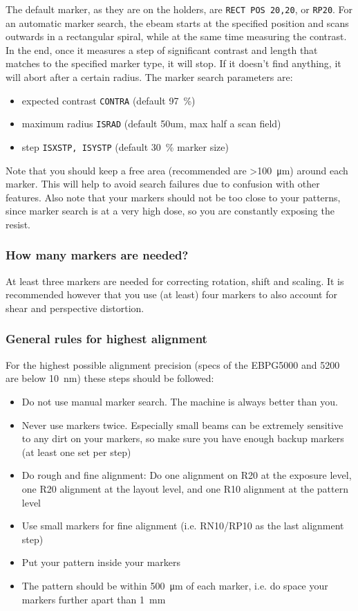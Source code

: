 The default marker, as they are on the holders, are \lstinline|RECT POS 20,20|, or \lstinline|RP20|.
For an automatic marker search, the ebeam starts at the specified position and scans outwards in a rectangular spiral, while at the same time measuring the contrast. In the end, once it measures a step of significant contrast and length that matches to the specified marker type, it will stop. If it doesn't find anything, it will abort after a certain radius.
The marker search parameters are:
\begin{itemize}
	\item expected contrast \lstinline|CONTRA| (default \SI{97}{\percent})
	\item maximum radius \lstinline|ISRAD| (default 50um, max half a scan field)
	\item step \lstinline|ISXSTP, ISYSTP| (default \SI{30}{\percent} marker size)
\end{itemize}
 
Note that you should keep a free area (recommended are >\SI{100}{\micro\meter}) around each marker. This will help to avoid search failures due to confusion with other features. Also note that your markers should not be too close to your patterns, since marker search is at a very high dose, so you are constantly exposing the resist.

\subsubsection{How many markers are needed?}
At least three markers are needed for correcting rotation, shift and scaling. It is recommended however that you use (at least) four markers to also account for shear and perspective distortion.

\subsubsection{General rules for highest alignment}
For the highest possible alignment precision (specs of the EBPG5000 and 5200 are below \SI{10}{\nano\meter}) these steps should be followed:
\begin{itemize}
	\item Do not use manual marker search. The machine is always better than you.
	\item Never use markers twice. Especially small beams can be extremely sensitive to any dirt on your markers, so make sure you have enough backup markers (at least one set per step)
	\item Do rough and fine alignment: Do one alignment on R20 at the exposure level, one R20 alignment at the layout level, and one R10 alignment at the pattern level
	\item Use small markers for fine alignment (i.e. RN10/RP10 as the last alignment step)
	\item Put your pattern inside your markers
	\item The pattern should be within \SI{500}{\micro\meter} of each marker, i.e. do space your markers further apart than \SI{1}{\milli\meter}
\end{itemize}


